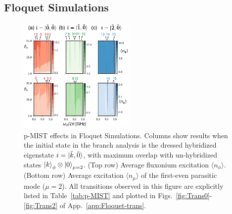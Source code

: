 \documentclass[%
reprint,
superscriptaddress,
 amsmath,amssymb,
 aps,
 prx,
longbibliography,
floatfix,
]{revtex4-2}
\begin{document}
\subsection{Floquet Simulations} 
\begin{figure}[!htb]
    \centering
    \includegraphics[width=0.5\textwidth]{Figures/Floquet_min.pdf}
    \caption{p-MIST effects in Floquet Simulations. Columns show results when the initial state in the branch analysis is the dressed hybridized eigenstate $i=\ket{\tilde{k},\tilde{0}}$, with maximum overlap with un-hybridized states $\ket{k}_\phi\otimes\ket{0}_{\mu=2}$. (Top row) Average fluxonium excitation $\langle n_\phi\rangle $. (Bottom row) Average excitation $\langle n_\mu\rangle$ of the first-even parasitic mode ($\mu=2$). %
    All transitions observed in this figure are explicitly listed in Table~\ref{tab:p-MIST} and plotted in Figs.~\ref{fig:Trans0}-\ref{fig:Trans2} of App.~\ref{app:Floquet-trans}.}
    \label{fig:Floquet}
\end{figure}
\end{document}
